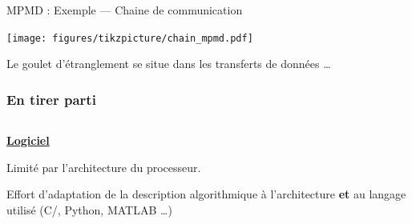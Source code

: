 \documentclass[../main.tex]{subfiles}
\begin{document}
\begin{frame}{MPMD : Exemple --- Chaine de communication}
  \begin{center}
    \texttt{[image: figures/tikzpicture/chain\_mpmd.pdf]}

    \vspace{1 em}

    Le goulet d'étranglement se situe dans les transferts de données \dots

  \end{center}
\end{frame}

\begin{frame}
  \frametitle{En tirer parti}

  \begin{columns}
    \begin{column}{.5\linewidth}
      \begin{overlayarea}{\linewidth}{.85\textheight}
        \centering
        \textbf{\large \underline{\phantom{g}Logiciel\phantom{g}}} \vspace{.25 em}

        \begin{ctrlitemize}{.5 em}
          \item Limité par l'architecture du processeur.
          \item Effort d'adaptation de la description algorithmique à l'architecture \cite{armNEONProgrammerGuide2013,intelrArchitectureInstructionSet2022} \textbf{et} au langage utilisé (C/\cpp{}, Python, MATLAB \dots)
          \item []
        \end{ctrlitemize}


\end{overlayarea}
\end{column}
\end{columns}
\end{frame}
\end{document}
